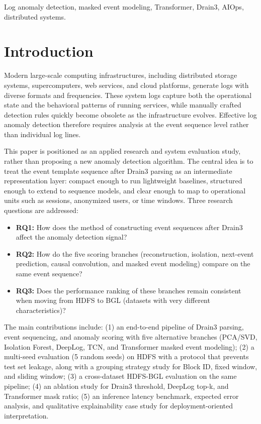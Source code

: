 \documentclass[conference]{IEEEtran}
\begin{document}
\begin{IEEEkeywords}
Log anomaly detection, masked event modeling, Transformer, Drain3, AIOps, distributed systems.
\end{IEEEkeywords}

\section{Introduction}
Modern large-scale computing infrastructures, including distributed storage systems, supercomputers, web services, and cloud platforms, generate logs with diverse formats and frequencies. These system logs capture both the operational state and the behavioral patterns of running services, while manually crafted detection rules quickly become obsolete as the infrastructure evolves. Effective log anomaly detection therefore requires analysis at the event sequence level rather than individual log lines.

This paper is positioned as an applied research and system evaluation study, rather than proposing a new anomaly detection algorithm. The central idea is to treat the event template sequence after Drain3 parsing as an intermediate representation layer: compact enough to run lightweight baselines, structured enough to extend to sequence models, and clear enough to map to operational units such as sessions, anonymized users, or time windows. Three research questions are addressed:
\begin{itemize}
    \item \textbf{RQ1:} How does the method of constructing event sequences after Drain3 affect the anomaly detection signal?
    \item \textbf{RQ2:} How do the five scoring branches (reconstruction, isolation, next-event prediction, causal convolution, and masked event modeling) compare on the same event sequence?
    \item \textbf{RQ3:} Does the performance ranking of these branches remain consistent when moving from HDFS to BGL (datasets with very different characteristics)?
\end{itemize}

The main contributions include: (1) an end-to-end pipeline of Drain3 parsing, event sequencing, and anomaly scoring with five alternative branches (PCA/SVD, Isolation Forest, DeepLog, TCN, and Transformer masked event modeling); (2) a multi-seed evaluation (5 random seeds) on HDFS with a protocol that prevents test set leakage, along with a grouping strategy study for Block ID, fixed window, and sliding window; (3) a cross-dataset HDFS-BGL evaluation on the same pipeline; (4) an ablation study for Drain3 threshold, DeepLog top-k, and Transformer mask ratio; (5) an inference latency benchmark, expected error analysis, and qualitative explainability case study for deployment-oriented interpretation.
\end{document}
